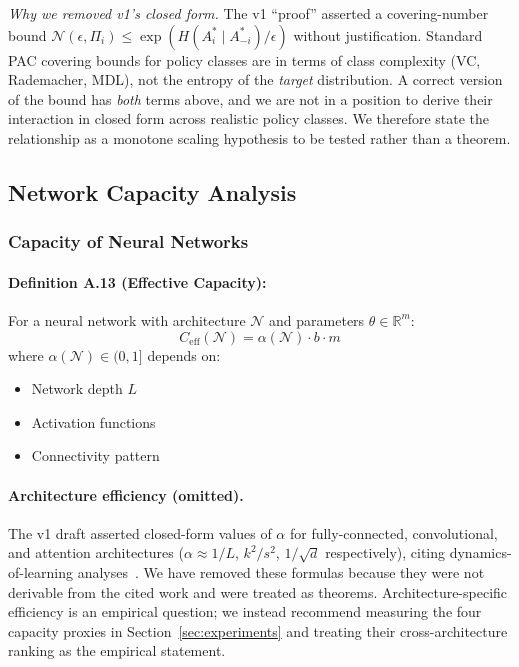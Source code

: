 \documentclass[10pt, letterpaper]{article}
\begin{document}
\emph{Why we removed v1's closed form.} The v1 ``proof'' asserted a covering-number bound $\mathcal{N}(\epsilon, \Pi_i) \leq \exp(H(A_i^*\mid A_{-i}^*)/\epsilon)$ without justification. Standard PAC covering bounds for policy classes are in terms of class complexity (VC, Rademacher, MDL), not the entropy of the \emph{target} distribution. A correct version of the bound has \emph{both} terms above, and we are not in a position to derive their interaction in closed form across realistic policy classes. We therefore state the relationship as a monotone scaling hypothesis to be tested rather than a theorem.

\subsection{Network Capacity Analysis}

\subsubsection{Capacity of Neural Networks}

\paragraph{Definition A.13 (Effective Capacity):} For a neural network with architecture $\mathcal{N}$ and parameters $\theta \in \mathbb{R}^m$:
\[C_{\text{eff}}(\mathcal{N}) = \alpha(\mathcal{N}) \cdot b \cdot m\]
where $\alpha(\mathcal{N}) \in (0,1]$ depends on:
\begin{itemize}
    \item Network depth $L$
    \item Activation functions
    \item Connectivity pattern
\end{itemize}

\paragraph{Architecture efficiency (omitted).} The v1 draft asserted closed-form values of $\alpha$ for fully-connected, convolutional, and attention architectures ($\alpha \approx 1/L$, $k^2/s^2$, $1/\sqrt{d}$ respectively), citing dynamics-of-learning analyses~\cite{saxe2019}. We have removed these formulas because they were not derivable from the cited work and were treated as theorems. Architecture-specific efficiency is an empirical question; we instead recommend measuring the four capacity proxies in Section~\ref{sec:experiments} and treating their cross-architecture ranking as the empirical statement.
\end{document}
